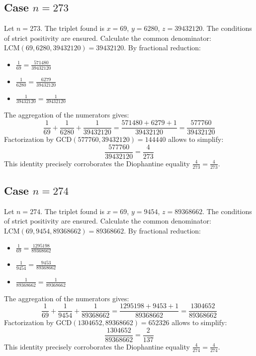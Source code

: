 \documentclass[11pt,a4paper]{article}
\begin{document}
\subsection{Case $n = 273$}
Let $n = 273$. The triplet found is $x = 69$, $y = 6280$, $z = 39432120$.
The conditions of strict positivity are ensured.
Calculate the common denominator: $\text{LCM}(69, 6280, 39432120) = 39432120$.
By fractional reduction:
\begin{itemize}
    \item $\frac{1}{69} = \frac{571480}{39432120}$
    \item $\frac{1}{6280} = \frac{6279}{39432120}$
    \item $\frac{1}{39432120} = \frac{1}{39432120}$
\end{itemize}
The aggregation of the numerators gives:
$$ \frac{1}{69} + \frac{1}{6280} + \frac{1}{39432120} = \frac{571480 + 6279 + 1}{39432120} = \frac{577760}{39432120} $$
Factorization by $\text{GCD}(577760, 39432120) = 144440$ allows to simplify:
$$ \frac{577760}{39432120} = \frac{4}{273} $$
This identity precisely corroborates the Diophantine equality $\frac{4}{273} = \frac{4}{273}$.

\subsection{Case $n = 274$}
Let $n = 274$. The triplet found is $x = 69$, $y = 9454$, $z = 89368662$.
The conditions of strict positivity are ensured.
Calculate the common denominator: $\text{LCM}(69, 9454, 89368662) = 89368662$.
By fractional reduction:
\begin{itemize}
    \item $\frac{1}{69} = \frac{1295198}{89368662}$
    \item $\frac{1}{9454} = \frac{9453}{89368662}$
    \item $\frac{1}{89368662} = \frac{1}{89368662}$
\end{itemize}
The aggregation of the numerators gives:
$$ \frac{1}{69} + \frac{1}{9454} + \frac{1}{89368662} = \frac{1295198 + 9453 + 1}{89368662} = \frac{1304652}{89368662} $$
Factorization by $\text{GCD}(1304652, 89368662) = 652326$ allows to simplify:
$$ \frac{1304652}{89368662} = \frac{2}{137} $$
This identity precisely corroborates the Diophantine equality $\frac{4}{274} = \frac{4}{274}$.
\end{document}
